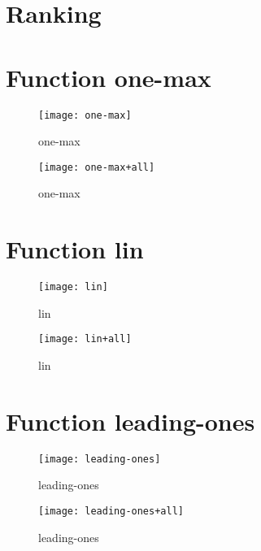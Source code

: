 \graphicspath{{../graphics/}}
\section{Ranking}
\begin{center}

\end{center}

\newpage
\section{Function one-max}
\begin{center}

\end{center}
\begin{center}

\end{center}
\begin{figure}[h]
\centering
\texttt{[image: one-max]}
\caption{one-max}
\end{figure}
\begin{figure}[h]
\centering
\texttt{[image: one-max+all]}
\caption{one-max}
\end{figure}
\newpage
\section{Function lin}
\begin{center}

\end{center}
\begin{center}

\end{center}
\begin{figure}[h]
\centering
\texttt{[image: lin]}
\caption{lin}
\end{figure}
\begin{figure}[h]
\centering
\texttt{[image: lin+all]}
\caption{lin}
\end{figure}
\newpage
\section{Function leading-ones}
\begin{center}

\end{center}
\begin{center}

\end{center}
\begin{figure}[h]
\centering
\texttt{[image: leading-ones]}
\caption{leading-ones}
\end{figure}
\begin{figure}[h]
\centering
\texttt{[image: leading-ones+all]}
\caption{leading-ones}
\end{figure}
\newpage
